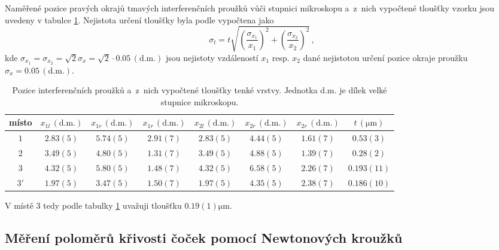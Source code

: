 \documentclass{../concepts/titul_protokol_p/prepareprotokol} %
\newcommand{\relative}[1]{
\frac{\sigma_{#1}}{#1}
}
\newcommand{\squared}[1]{
\left( #1 \right)^2
}
\newcommand{\relsqr}[1]{
\squared{\relative{#1}}
}
\begin{document}
Naměřené pozice pravých okrajů tmavých interferenčních proužků vůči stupnici mikroskopu a~z~nich vypočtené
tloušťky vzorku jsou uvedeny v tabulce \ref{tab:tloustky}. Nejistota určení tloušťky byla podle \cite{englich}
vypočtena jako
\begin{equation}
    \label{eq:sigmat}
    \sigma_t = t \sqrt{\relsqr{x_1} + \relsqr{x_2}} \,,
\end{equation}
kde $\sigma_{x_1} = \sigma_{x_2} = \sqrt{2} \sigma_x = \sqrt{2} \cdot 0.05 \, (\mathrm{d.m.})$ jsou nejistoty
vzdáleností $x_1$ resp. $x_2$ dané nejistotou určení pozice okraje proužku $\sigma_x = 0.05 \,(\mathrm{d.m.})$.


\begin{table}[!htbp]
\centering
\caption{Pozice interferenčních proužků a~z~nich vypočtené tloušťky tenké vrstvy. Jednotka d.m.
je dílek velké stupnice mikroskopu.}
\begin{tabular}{cccccccc}
 \toprule
 místo & $x_{1l}\, (\mathrm{d.m.})$ & $x_{1r}\, (\mathrm{d.m.})$ & 
 $x_{1r}\, (\mathrm{d.m.})$ & $x_{2l}\, (\mathrm{d.m.})$ & 
 $x_{2r}\, (\mathrm{d.m.})$ & $x_{2r}\, (\mathrm{d.m.})$ & $t \, (\unit{\micro \meter})$\\
 \midrule
 $1$ & $2.83(5)$ & $5.74(5)$ & $2.91(7)$ & $2.83(5)$ & $4.44(5)$ & $1.61(7)$ & $0.53(3)$ \\
 $2$ & $3.49(5)$ & $4.80(5)$ & $1.31(7)$ & $3.49(5)$ & $4.88(5)$ & $1.39(7)$ & $0.28(2)$ \\
 $3$ & $4.32(5)$ & $5.80(5)$ & $1.48(7)$ & $4.32(5)$ & $6.58(5)$ & $2.26(7)$ & $0.193(11)$ \\
 $3'$ & $1.97(5)$ & $3.47(5)$ & $1.50(7)$ & $1.97(5)$ & $4.35(5)$ & $2.38(7)$ & $0.186(10)$ \\
 \bottomrule
\end{tabular}
\label{tab:tloustky}
\end{table}

V místě $3$ tedy podle tabulky \ref{tab:tloustky} uvažuji tloušťku $0.19(1) \unit{\micro\meter}$.

\subsection{Měření poloměrů křivosti čoček pomocí Newtonových kroužků}
\end{document}
